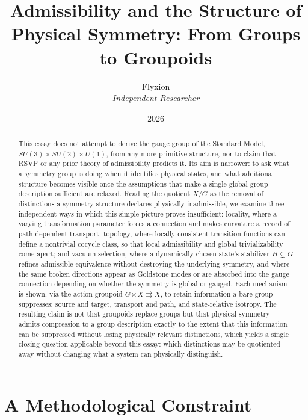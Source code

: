 \documentclass[11pt]{article}
\title{Admissibility and the Structure of Physical Symmetry: From Groups to Groupoids}
\author{Flyxion \\ \textit{Independent Researcher}}
\date{2026}
\begin{document}
\maketitle

\begin{abstract}
This essay does not attempt to derive the gauge group of the Standard Model, $SU(3) \times SU(2) \times U(1)$, from any more primitive structure, nor to claim that RSVP or any prior theory of admissibility predicts it. Its aim is narrower: to ask what a symmetry group is doing when it identifies physical states, and what additional structure becomes visible once the assumptions that make a single global group description sufficient are relaxed. Reading the quotient $X/G$ as the removal of distinctions a symmetry structure declares physically inadmissible, we examine three independent ways in which this simple picture proves insufficient: locality, where a varying transformation parameter forces a connection and makes curvature a record of path-dependent transport; topology, where locally consistent transition functions can define a nontrivial cocycle class, so that local admissibility and global trivializability come apart; and vacuum selection, where a dynamically chosen state's stabilizer $H \subsetneq G$ refines admissible equivalence without destroying the underlying symmetry, and where the same broken directions appear as Goldstone modes or are absorbed into the gauge connection depending on whether the symmetry is global or gauged. Each mechanism is shown, via the action groupoid $G \ltimes X \rightrightarrows X$, to retain information a bare group suppresses: source and target, transport and path, and state-relative isotropy. The resulting claim is not that groupoids replace groups but that physical symmetry admits compression to a group description exactly to the extent that this information can be suppressed without losing physically relevant distinctions, which yields a single closing question applicable beyond this essay: which distinctions may be quotiented away without changing what a system can physically distinguish.
\end{abstract}

\section{A Methodological Constraint}
\end{document}
